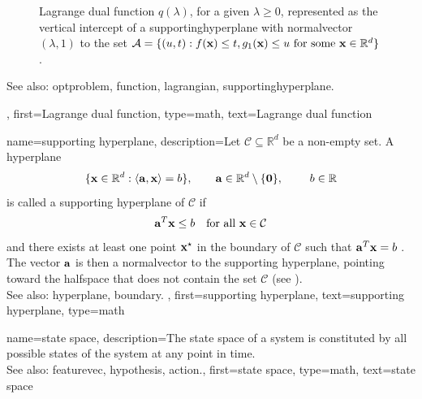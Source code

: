 {{\begin{figure}[H]
		\caption{Lagrange dual \gls{function} $q(\lambda)$, for a given $\lambda\geq0$, represented as the vertical intercept 
			of a \gls{supportinghyperplane} with \gls{normalvector} $(\lambda,1)$ 
			to the set $\mathcal{A}=\{(u,t): f({\bf x}) \leq t, g_{1}({\bf x}) \leq u \mbox{ for some } {\bf x} \in \mathbb{R}^{d}\}$ 
			\cite [Sec. 5.3]{BoydConvexBook}.	\label{fig_dual_function_dict}}
		\end{figure}
		See also: \gls{optproblem}, \gls{function}, \gls{lagrangian}, \gls{supportinghyperplane}. },
	first={Lagrange dual function},
	type=math,
	text={Lagrange dual function}
}

{name={supporting hyperplane},
	description={Let $\mathcal{C} \subseteq \mathbb{R}^d$ be a non-empty set.
		A \gls{hyperplane}
		\[  
			\{ {\bf x} \in \mathbb{R}^d : \langle {\bf a}, {\bf x} \rangle = b \},
			\qquad {\bf a} \in \mathbb{R}^d \setminus \{ \mathbf{0} \}, \qquad \ b \in \mathbb{R}
		\]
		is called a supporting \gls{hyperplane} of $\mathcal{C}$ if
		\begin{align*}
			{\bf a}^{T} {\bf x} \le b 
			\quad \text{for all } {\bf x} \in \mathcal{C}
		\end{align*}
		and there exists at least one point ${\bf x}^\star$ in the \gls{boundary} of $\mathcal{C}$ such that
		${\bf a}^{T} {\bf x} = b$ \cite{BoydConvexBook}. The \gls{vector} ${\bf a}$ is then a \gls{normalvector} 
		to the supporting \gls{hyperplane}, pointing toward the \gls{halfspace} that does not 
		contain the set $\mathcal{C}$ (see \cite[Sec. 2.5.2]{BoydConvexBook}). 
		\\
		See also: \gls{hyperplane}, \gls{boundary}. }, 
	first={supporting hyperplane}, 
	text={supporting hyperplane}, 
	type=math
}

{name={state space},
	description={The \gls{state} space of a system is constituted  
		by all possible \glspl{state} of the system at any point in time. 
		\\
		See also: \gls{featurevec}, \gls{hypothesis}, \gls{action}.},
	first={state space},
	type=math,
	text={state space}
}

